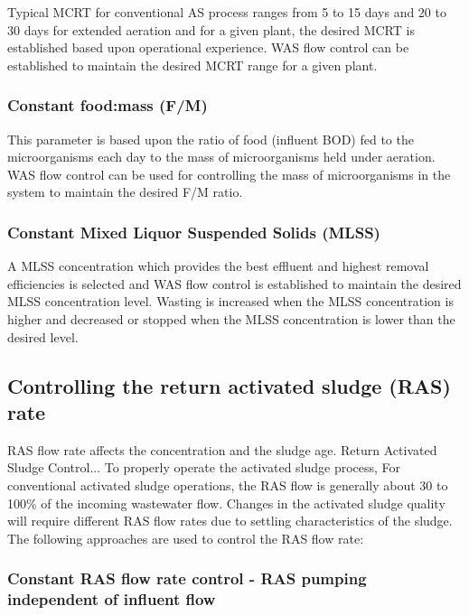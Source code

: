 Typical MCRT for conventional AS process ranges from 5 to 15 days and 20 to 30 days for extended aeration and for a given plant, the desired MCRT is established based upon operational experience.  WAS flow control can be established to maintain the desired MCRT range for a given plant. 

		\subsubsection{Constant food:mass (F/M)}	

This parameter is based upon the ratio of food (influent BOD) fed to the microorganisms each day to the mass of microorganisms held under aeration. WAS flow control can be used for controlling the mass of microorganisms in the system to maintain the desired F/M ratio.

		\subsubsection{Constant Mixed Liquor Suspended Solids (MLSS)}	

A MLSS concentration which provides the best effluent and highest removal efficiencies is selected and WAS flow control is established to maintain the desired MLSS concentration level.  Wasting is increased when the MLSS concentration is higher and decreased or stopped when the MLSS concentration is lower than the desired level.

		\subsection{Controlling the return activated sludge (RAS) rate}	

RAS flow rate affects the concentration and the sludge age.  
Return Activated Sludge Control...
To properly operate the activated sludge process,  For conventional activated sludge operations, the RAS flow is generally about 30 to 100\% of the incoming wastewater flow. Changes in the activated sludge quality will require different RAS flow rates due to settling characteristics of the sludge. The following approaches are used to control the RAS flow rate:

		\subsubsection{Constant RAS flow rate control - RAS pumping independent of influent flow}	


